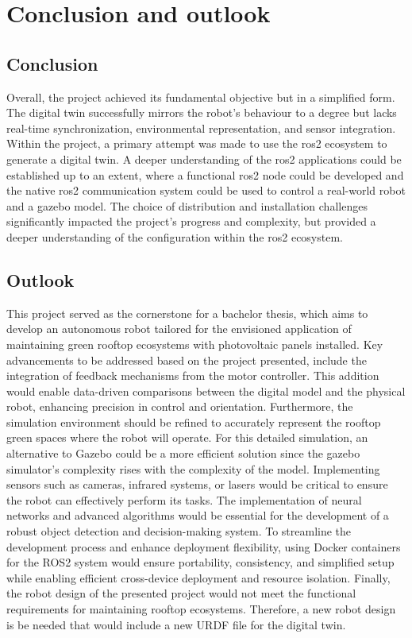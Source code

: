 \chapter{Conclusion and outlook}

\section{Conclusion}

Overall, the project achieved its fundamental objective but in a simplified form. The digital twin successfully mirrors the robot's behaviour to a degree but lacks real-time synchronization, environmental representation, and sensor integration. Within the project, a primary attempt was made to use the ros2 ecosystem to generate a digital twin. A deeper understanding of the ros2 applications could be established up to an extent, where a functional ros2 node could be developed and the native ros2 communication system could be used to control a real-world robot and a gazebo model. The choice of distribution and installation challenges significantly impacted the project's progress and complexity, but provided a deeper understanding of the configuration within the ros2 ecosystem.

\section{Outlook}



This project served as the cornerstone for a bachelor thesis, which aims to develop an autonomous robot tailored for the envisioned application of maintaining green rooftop ecosystems with photovoltaic panels installed.
Key advancements to be addressed based on the project presented, include the integration of feedback mechanisms from the motor controller. This addition would enable data-driven comparisons between the digital model and the physical robot, enhancing precision in control and orientation. Furthermore, the simulation environment should be refined to accurately represent the rooftop green spaces where the robot will operate. For this detailed simulation, an alternative to Gazebo could be a more efficient solution since the gazebo simulator's complexity rises with the complexity of the model. Implementing sensors such as cameras, infrared systems, or lasers would be critical to ensure the robot can effectively perform its tasks. The implementation of neural networks and advanced algorithms would be essential for the development of a robust object detection and decision-making system. To streamline the development process and enhance deployment flexibility, using Docker containers for the ROS2 system would ensure portability, consistency, and simplified setup while enabling efficient cross-device deployment and resource isolation. Finally, the robot design of the presented project would not meet the functional requirements for maintaining rooftop ecosystems. Therefore, a new robot design is be needed that would include a new URDF file for the digital twin.